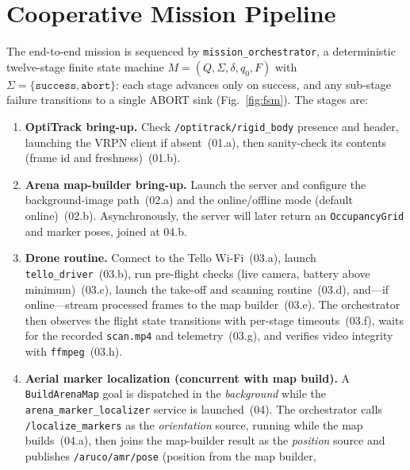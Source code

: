 \documentclass[conference]{IEEEtran}
\newcommand{\subsys}[1]{\texttt{#1}}      %
\begin{document}
\section{Cooperative Mission Pipeline}
\label{sec:pipeline}
The end-to-end mission is sequenced by \subsys{mission\_orchestrator}, a
deterministic twelve-stage finite state machine
$M=(Q,\Sigma,\delta,q_0,F)$ with $\Sigma=\{\texttt{success},\texttt{abort}\}$:
each stage advances only on success, and any sub-stage failure transitions to a
single ABORT sink (Fig.~\ref{fig:fsm}). The stages are:
\begin{enumerate}
  \item[01.] \textbf{OptiTrack bring-up.} Check \texttt{/optitrack/rigid\_body}
             presence and header, launching the VRPN client if absent~(01.a),
             then sanity-check its contents (frame id and freshness)~(01.b).
  \item[02.] \textbf{Arena map-builder bring-up.} Launch the server and configure
             the background-image path~(02.a) and the online/offline mode
             (default online)~(02.b). Asynchronously, the server will later
             return an \texttt{OccupancyGrid} and marker poses, joined at 04.b.
  \item[03.] \textbf{Drone routine.} Connect to the Tello Wi-Fi~(03.a), launch
             \subsys{tello\_driver}~(03.b), run pre-flight checks (live camera,
             battery above minimum)~(03.c), launch the take-off and scanning
             routine~(03.d), and---if online---stream processed frames to the
             map builder~(03.e). The orchestrator then observes the flight state
             transitions with per-stage timeouts~(03.f), waits for the recorded
             \texttt{scan.mp4} and telemetry~(03.g), and verifies video integrity
             with \texttt{ffmpeg}~(03.h).
  \item[04.] \textbf{Aerial marker localization (concurrent with map build).}
             A \texttt{BuildArenaMap} goal is dispatched in the
             \emph{background} while the \subsys{arena\_marker\_localizer} service
             is launched~(04). The orchestrator calls \texttt{/localize\_markers}
             as the \emph{orientation} source, running while the map builds~(04.a),
             then joins the map-builder result as the \emph{position} source and
             publishes \texttt{/aruco/amr/pose} (position from the map builder,

\end{enumerate}
\end{document}
